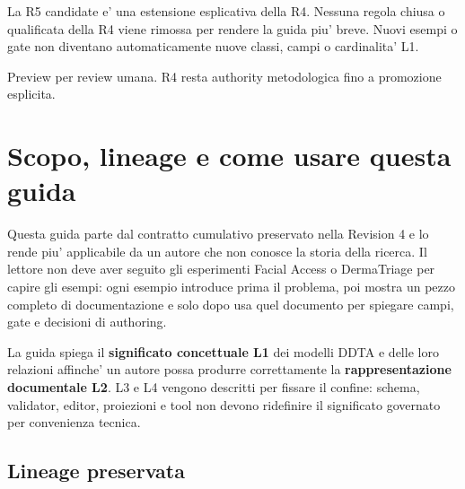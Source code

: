 \documentclass[11pt,a4paper]{article}
\begin{document}
\begin{titlepage}
\vfill
\begin{ddtacore}[title={Regola di costruzione della R5 candidate}]
La R5 candidate e' una estensione esplicativa della R4. Nessuna regola chiusa o qualificata della R4 viene rimossa per rendere la guida piu' breve. Nuovi esempi o gate non diventano automaticamente nuove classi, campi o cardinalita' L1.
\end{ddtacore}

\begin{flushright}
\sffamily\small\color{DDTAGray}Preview per review umana. R4 resta authority metodologica fino a promozione esplicita.
\end{flushright}
\end{titlepage}

\tableofcontents
\clearpage

\section{Scopo, lineage e come usare questa guida}

Questa guida parte dal contratto cumulativo preservato nella Revision 4 e lo rende piu' applicabile da un autore che non conosce la storia della ricerca. Il lettore non deve aver seguito gli esperimenti Facial Access o DermaTriage per capire gli esempi: ogni esempio introduce prima il problema, poi mostra un pezzo completo di documentazione e solo dopo usa quel documento per spiegare campi, gate e decisioni di authoring.

\begin{ddtaprinciple}[title={Scopo primario: L1 -> L2}]
La guida spiega il \textbf{significato concettuale L1} dei modelli DDTA e delle loro relazioni affinche' un autore possa produrre correttamente la \textbf{rappresentazione documentale L2}. L3 e L4 vengono descritti per fissare il confine: schema, validator, editor, proiezioni e tool non devono ridefinire il significato governato per convenienza tecnica.
\end{ddtaprinciple}

\subsection{Lineage preservata}
\end{document}
